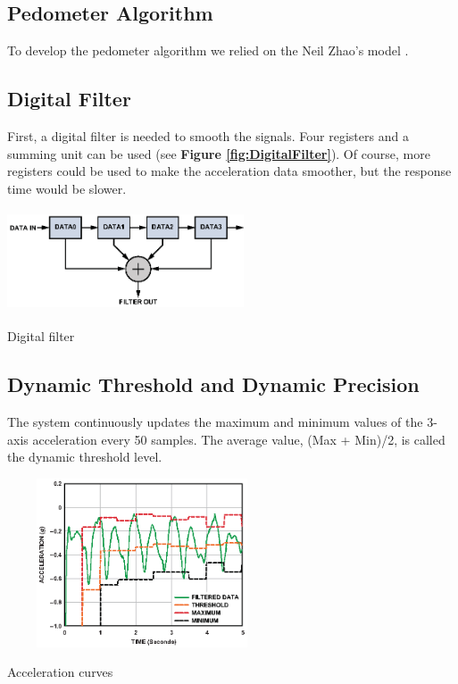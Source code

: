 \documentclass[a4paper,10pt]{article}
\makeatletter
\newenvironment{figurehere}{\def\@captype{figure}\vspace{2ex}}{\vspace{1ex}}
\makeatother
\begin{document}
\begin{multicols}{2}
\section{Pedometer Algorithm}

To develop the pedometer algorithm we relied on the Neil Zhao's model .\cite{NeilZhao}


\subsection{Digital Filter}

First, a digital filter is needed to smooth the signals. Four registers and a summing unit can be used  (see {\bf Figure
\ref{fig:DigitalFilter}}).  Of course, more registers could be used to make the acceleration data smoother, but the response time would be slower.

\begin{figurehere}
 \centering
 \includegraphics[width=7cm, height=3cm]{./eps/DigitalFilter.eps}
 \caption{Digital filter}
 \label{fig:DigitalFilter}
\end{figurehere}

\subsection{Dynamic Threshold and Dynamic Precision}

The system continuously updates the maximum and minimum values of the 3-axis acceleration every 50 samples. The average value, (Max + Min)/2, is called the dynamic threshold level. 

\begin{figurehere}
 \centering
 \includegraphics[width=8cm, height=5cm]{./eps/Threshold.eps}
 \caption{Acceleration curves}
 \label{fig:Threshold}
\end{figurehere}


\end{multicols}
\end{document}
